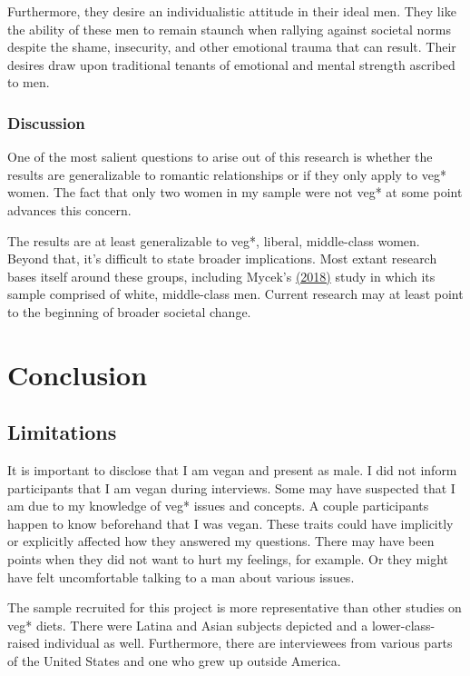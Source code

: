 \documentclass[twoside]{report}
\let\oldsection\section
\renewcommand\section{\clearpage\oldsection}
\begin{document}
Furthermore, they desire an individualistic attitude in their ideal men. They like the ability of these men to remain staunch when rallying against societal norms despite the shame, insecurity, and other emotional trauma that can result. Their desires draw upon traditional tenants of emotional and
mental strength ascribed to men.

\subsubsection{Discussion}

One of the most salient questions to arise out of this research is
whether the results are generalizable to romantic relationships or if
they only apply to veg* women. The fact that only two women in my sample
were not veg* at some point advances this concern.

The results are at least generalizable to veg*, liberal, middle-class
women. Beyond that, it's difficult to state broader implications. Most extant
research bases itself around these groups, including Mycek's \hyperlink{mycek}{(2018)} study in which its sample comprised of white, middle-class men. Current research may at least point to the beginning of broader societal change.

\section{Conclusion}
\subsection{Limitations}

It is important to disclose that I am vegan and present as male.
I did not inform participants that I am vegan during interviews. Some
may have suspected that I am due to my knowledge of veg* issues and
concepts. A couple participants happen to know beforehand that I was
vegan. These traits could have implicitly or explicitly affected how they answered my questions. There may have been points when they did not want to hurt my feelings, for example. Or they might have felt uncomfortable talking to a man about various issues.

The sample recruited for this project is more representative than other
studies on veg* diets. There were Latina and Asian subjects depicted and
a lower-class-raised individual as well. Furthermore, there are
interviewees from various parts of the United States and one
who grew up outside America.
\end{document}
